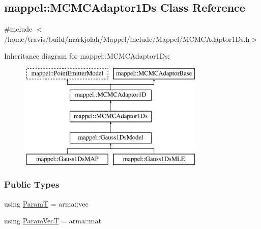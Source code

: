 \hypertarget{classmappel_1_1MCMCAdaptor1Ds}{}\subsection{mappel\+:\+:M\+C\+M\+C\+Adaptor1\+Ds Class Reference}
\label{classmappel_1_1MCMCAdaptor1Ds}


{\ttfamily \#include $<$/home/travis/build/markjolah/\+Mappel/include/\+Mappel/\+M\+C\+M\+C\+Adaptor1\+Ds.\+h$>$}

Inheritance diagram for mappel\+:\+:M\+C\+M\+C\+Adaptor1\+Ds\+:\begin{figure}[H]
\begin{center}
\leavevmode
\includegraphics[height=5.000000cm]{classmappel_1_1MCMCAdaptor1Ds}
\end{center}
\end{figure}
\subsubsection*{Public Types}
\begin{DoxyCompactItemize}
\item 
using \hyperlink{classmappel_1_1PointEmitterModel_a665ec6aea3aac139bb69a23c06d4b9a1}{ParamT} = arma\+::vec
\item 
using \hyperlink{classmappel_1_1PointEmitterModel_add253b568d763f1513a810aac35de719}{Param\+VecT} = arma\+::mat
\end{DoxyCompactItemize}
